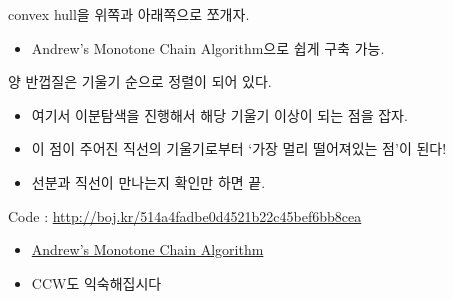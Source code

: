 \documentclass[hyperref={unicode}]{beamer}
\begin{document}
    \begin{frame}
         convex hull을 위쪽과 아래쪽으로 쪼개자.
        \begin{itemize}
            \item<2-> Andrew's Monotone Chain Algorithm으로 쉽게 구축 가능.
        \end{itemize}
         양 반껍질은 기울기 순으로 정렬이 되어 있다.
        \begin{itemize}
        \item<4-> 여기서 이분탐색을 진행해서 해당 기울기 이상이 되는 점을 잡자.
        \item<5-> 이 점이 주어진 직선의 기울기로부터 `가장 멀리 떨어져있는 점'이 된다! 
        \item<6-> 선분과 직선이 만나는지 확인만 하면 끝.
        \end{itemize}
    \end{frame}
    
    \begin{frame}
        Code : \url{http://boj.kr/514a4fadbe0d4521b22c45bef6bb8cea}
        \begin{itemize}
            \item {\color{blue}\href{https://en.wikibooks.org/wiki/Algorithm_Implementation/Geometry/Convex_hull/Monotone_chain}{Andrew's Monotone Chain Algorithm}}
            \item CCW도 익숙해집시다
        \end{itemize}
        
    \end{frame}
\end{document}
